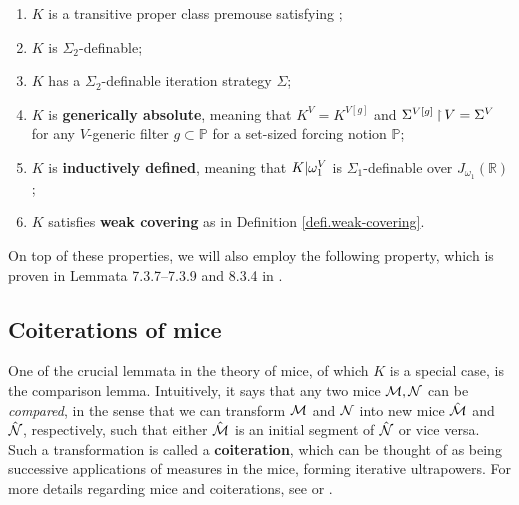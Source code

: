 \documentclass[../../main]{subfiles}
\begin{document}
\begin{enumerate}
  \item $K$ is a transitive proper class premouse satisfying \zfc;
  \item $K$ is $\Sigma_2$-definable;
  \item $K$ has a $\Sigma_2$-definable iteration strategy $\Sigma$;
  \item $K$ is \textbf{generically absolute}, meaning that $K^V=K^{V[g]}$ and $\Sigma^{V[g]}\operatorname{\upharpoonright} V=\Sigma^V$ for any $V$-generic filter $g\subset\mathbb P$ for a set-sized forcing notion $\mathbb P$;
  \item $K$ is \textbf{inductively defined}, meaning that $K|\omega_1^V$ is $\Sigma_1$-definable over $J_{\omega_1}(\mathbb R)$;
  \item $K$ satisfies \textbf{weak covering} as in Definition \ref{defi.weak-covering}.\\
\end{enumerate}

On top of these properties, we will also employ the following property, which is proven in Lemmata 7.3.7--7.3.9 and 8.3.4 in \cite{Zeman}.


\subsection{Coiterations of mice}

One of the crucial lemmata in the theory of mice, of which $K$ is a special case, is the comparison lemma. Intuitively, it says that any two mice $\operatorname{\mathcal M},\operatorname{\mathcal N}$ can be \textit{compared}, in the sense that we can transform $\operatorname{\mathcal M}$ and $\operatorname{\mathcal N}$ into new mice $\hat{\operatorname{\mathcal M}}$ and $\hat{\operatorname{\mathcal N}}$, respectively, such that either $\hat{\operatorname{\mathcal M}}$ is an initial segment of $\hat{\operatorname{\mathcal N}}$ or vice versa. Such a transformation is called a \textbf{coiteration}, which can be thought of as being successive applications of measures in the mice, forming iterative ultrapowers. For more details regarding mice and coiterations, see \cite{steel2010outline} or \cite{MSc}.

\end{document}
